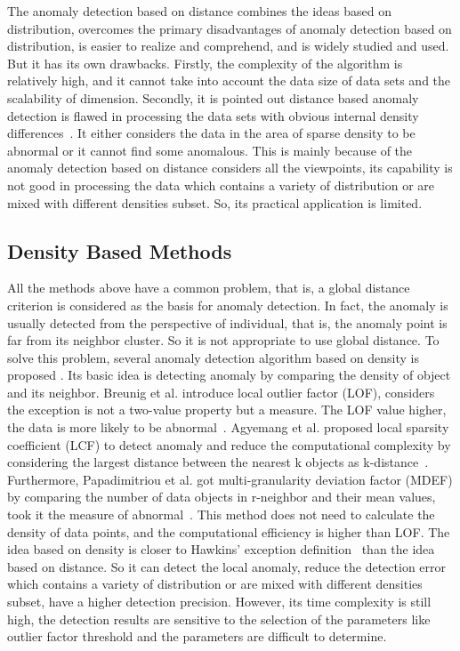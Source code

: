 The anomaly detection based on distance combines the ideas
based on distribution,
overcomes the primary disadvantages
of anomaly detection based on distribution,
is easier to realize and comprehend,
and is widely studied and used.
But it has its own drawbacks.
Firstly,
the complexity of the algorithm is relatively high,
and it cannot take into account
the data size of data sets and the scalability of dimension.
Secondly,
it is pointed out distance based anomaly detection is flawed in
processing the data sets with obvious internal density
differences~\cite{breunig2000lof}.
It either considers the data in the area of sparse
density to be abnormal or
it cannot find some anomalous.
This is mainly because of the anomaly detection based on
distance considers all the viewpoints,
its capability is not good in processing the data which
contains a variety of distribution or
are mixed with different densities subset.
So,
its practical application is limited.

\subsection{Density Based Methods}
All the methods above have a common problem,
that is,
a global distance criterion is considered as
the basis for anomaly detection.
In fact,
the anomaly is usually detected
from the perspective of individual,
that is,
the anomaly point is far from its neighbor cluster.
So it is not appropriate
to use global distance.
To solve this problem,
several anomaly detection
algorithm based
on density is proposed .
Its basic idea is detecting anomaly by comparing
the density of object and its neighbor.
Breunig et al. introduce local
outlier factor (LOF),
considers the exception is not a
two-value property but a measure.
The LOF value higher,
the data is more likely to be abnormal~\cite{breunig2000lof}.
Agyemang et al.
proposed local sparsity coefficient (LCF) to
detect anomaly and reduce
the computational complexity by considering
the largest distance between the nearest k objects as
k-distance~\cite{agyemang2004algorithm}.
Furthermore,
Papadimitriou et al. got multi-granularity
deviation factor (MDEF) by
comparing the number of data objects in r-neighbor and
their mean values,
took it the measure of abnormal~\cite{papadimitriou2003loci}.
This method does not need to calculate the density of data
points,
and the computational efficiency is higher than LOF.
The idea based on density is closer to Hawkins’ exception
definition~\cite{hawkins1980identification}
than the idea based on distance.
So it can detect the local anomaly,
reduce the detection error which contains
a variety of distribution or are mixed with different
densities subset,
have a higher detection precision.
However,
its time complexity is still high,
the detection
results are sensitive to the selection of the parameters like
outlier factor threshold and the parameters are difficult to
determine.

